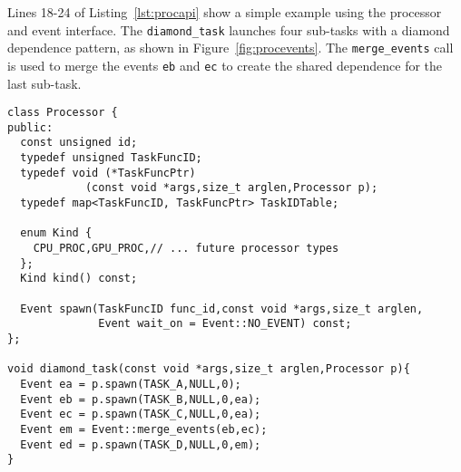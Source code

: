 Lines 18-24 of Listing~\ref{lst:procapi} show a simple example using 
the processor and event interface.  The {\tt diamond\_task} launches four
sub-tasks with a diamond dependence pattern, as shown in Figure~\ref{fig:procevents}.
The {\tt merge\_events} call
is used to merge the events {\tt eb} and {\tt ec} to create the shared dependence
for the last sub-task.

\begin{lstlisting}[float={t},label={lst:procapi},caption={Processor Interface and Example.},belowskip=0pt]
class Processor {
public:
  const unsigned id;
  typedef unsigned TaskFuncID;
  typedef void (*TaskFuncPtr)
            (const void *args,size_t arglen,Processor p);
  typedef map<TaskFuncID, TaskFuncPtr> TaskIDTable;

  enum Kind {
    CPU_PROC,GPU_PROC,// ... future processor types
  };
  Kind kind() const;

  Event spawn(TaskFuncID func_id,const void *args,size_t arglen,
              Event wait_on = Event::NO_EVENT) const;
};

void diamond_task(const void *args,size_t arglen,Processor p){
  Event ea = p.spawn(TASK_A,NULL,0);
  Event eb = p.spawn(TASK_B,NULL,0,ea);
  Event ec = p.spawn(TASK_C,NULL,0,ea);
  Event em = Event::merge_events(eb,ec);
  Event ed = p.spawn(TASK_D,NULL,0,em);
}
\end{lstlisting}


